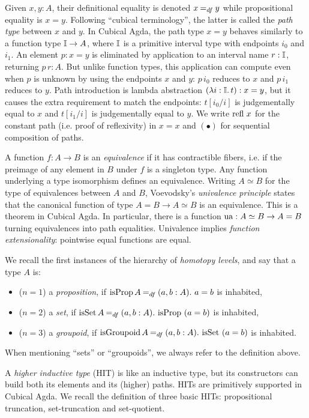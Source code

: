 \documentclass[final,a4paper,USenglish,cleveref]{lipics-v2021}
\begin{document}
Given $x, y : A$, their definitional equality is denoted $x \DefEq y$ while propositional equality is $x = y$.
Following ``cubical terminology'', the latter is called the \emph{path type} between $x$ and $y$.
In Cubical Agda, the path type $x = y$ behaves similarly to a function type $\mathbb{I} \to A$, where $\mathbb{I}$ is a primitive interval type with endpoints $i_0$ and $i_1$.
An element $p : x = y$ is eliminated by application to an interval name $r : \mathbb{I}$, returning $p \, r : A$.
But unlike function types, this application can compute even when $p$ is unknown by using the endpoints $x$ and $y$: $p \,i_0$ reduces to $x$ and $p \,i_1$ reduces to $y$.
Path introduction is lambda abstraction $(\lambda i : \mathbb{I}.\,t) : x = y$, but it causes the extra requirement to match the endpoints: $t[i_0 / i]$ is judgementally equal to $x$ and $t[i_1 / i]$ is judgementally equal to  $y$. We write $\Refl\,x$ for the constant path (i.e. proof of reflexivity) in $x = x$ and $(\bullet)$ for sequential composition of paths.

A function $f : A \to B$ is an \emph{equivalence} if it has contractible fibers, i.e. if the preimage of any element in $B$ under $f$ is a singleton type. Any function underlying a type isomorphism defines an equivalence. Writing $A \simeq B$ for the type of equivalences between $A$ and $B$, Voevodsky's \emph{univalence principle} states that the canonical function of type $A = B \to A \simeq B$ is an equivalence. This is a theorem in Cubical Agda. In particular, there is a function $\Op{ua} : A \simeq B \to A = B$ turning equivalences into path equalities. Univalence implies \emph{function extensionality}: pointwise equal functions are equal.

We recall the first instances of the hierarchy of \emph{homotopy levels}, and say that a type $A$ is:
\begin{itemize}
  \item[] ($n = 1$) a \emph{proposition}, if
    $\IsProp A \DefEq (a , b : A)\Where a = b$ is inhabited,
  \item[] ($n = 2$) a \emph{set}, if
    $\IsSet A \DefEq (a, b : A)\Where \IsProp \ (a = b)$ is inhabited,
  \item[] ($n = 3$) a \emph{groupoid}, if
    $\IsGpd A \DefEq (a, b : A)\Where \IsSet \ (a = b)$ is inhabited.
\end{itemize}
When mentioning \enquote{sets} or \enquote{groupoids}, we always refer to the definition above.

A \emph{higher inductive type} (HIT) is like an inductive type, but its constructors can build both its elements and its (higher) paths. HITs are primitively supported in Cubical Agda. We recall the definition of three basic HITs: propositional truncation, set-truncation and set-quotient. 
\end{document}
